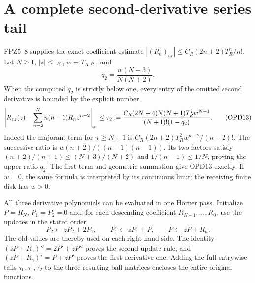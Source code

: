 \documentclass[11pt]{article}
\begin{document}
\section{A complete second-derivative series tail}
FPZ5--8 supplies the exact coefficient estimate
$|(R_n)_{ar}|\le C_R(2n+2)T_R^n/n!$. Let $N\ge1$,
$|z|\le\varrho$, $w=T_R\varrho$, and
\[
 q_2=\frac{w(N+3)}{N(N+2)}.
 \tag{OPD12}
\]
When the computed $q_2$ is strictly below one, every entry of
the omitted second derivative is bounded by the explicit number
\[
 \left|R_{zz}(z)-\sum_{n=2}^N n(n-1)R_nz^{n-2}\right|_{ar}
 \le \tau_2:={
 C_R(2N+4)N(N+1)T_R^2w^{N-1}
 \over (N+1)!(1-q_2)}.
 \tag{OPD13}
\]
Indeed the majorant term for $n\ge N+1$ is
$C_R(2n+2)T_R^2w^{n-2}/(n-2)!$.
The successive ratio is
$w(n+2)/((n+1)(n-1))$. Its two factors satisfy
$(n+2)/(n+1)\le(N+3)/(N+2)$ and
$1/(n-1)\le1/N$, proving the upper ratio $q_2$.
The first term and geometric summation give OPD13 exactly.
If $w=0$, the same formula is interpreted by its continuous limit;
the receiving finite disk has $w>0$.

All three derivative polynomials can be evaluated in one Horner pass.
Initialize $P=R_N$, $P_1=P_2=0$ and, for each descending coefficient
$R_{N-1},\ldots,R_0$, use the updates in the stated order
\[
 P_2\leftarrow zP_2+2P_1,\qquad
 P_1\leftarrow zP_1+P,\qquad P\leftarrow zP+R_n.
 \tag{OPD14}
\]
The old values are thereby used on each right-hand side. The
identity $(zP+R_n)''=2P'+zP''$ proves the second update rule,
and $(zP+R_n)'=P+zP'$ proves the first-derivative one.
Adding the full entrywise tails $\tau_0,\tau_1,\tau_2$ to the
three resulting ball matrices encloses the entire original functions.
\end{document}
